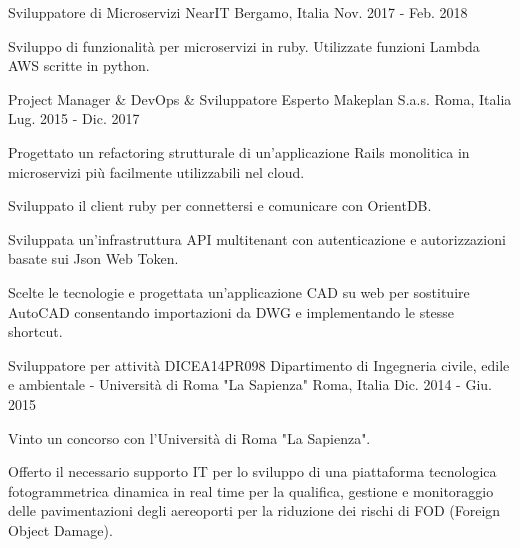 \begin{cventries}
  \cventry
    {Sviluppatore di Microservizi} %
    {NearIT} %
    {Bergamo, Italia} %
    {Nov. 2017 - Feb. 2018} %
    {
      \begin{cvitems} %
        \item {Sviluppo di funzionalità per microservizi in ruby. Utilizzate funzioni Lambda AWS scritte in python.}
      \end{cvitems}
    }

  \cventry
    {Project Manager \& DevOps \& Sviluppatore Esperto} %
    {Makeplan S.a.s.} %
    {Roma, Italia} %
    {Lug. 2015 - Dic. 2017} %
    {
      \begin{cvitems} %
        \item {Progettato un refactoring strutturale di un'applicazione Rails monolitica in microservizi più facilmente utilizzabili nel cloud.}
        \item {Sviluppato il client ruby per connettersi e comunicare con OrientDB.}
        \item {Sviluppata un'infrastruttura API multitenant con autenticazione e autorizzazioni basate sui Json Web Token.}
        \item {Scelte le tecnologie e progettata un'applicazione CAD su web per sostituire AutoCAD consentando importazioni da DWG e implementando le stesse shortcut.}
      \end{cvitems}
    }

  \cventry
    {Sviluppatore per attività DICEA14PR098} %
    {Dipartimento di Ingegneria civile, edile e ambientale - Università di Roma "La Sapienza"} %
    {Roma, Italia} %
    {Dic. 2014 - Giu. 2015} %
    {
      \begin{cvitems} %
        \item {Vinto un concorso con l'Università di Roma "La Sapienza".}
        \item {Offerto il necessario supporto IT per lo sviluppo di una piattaforma tecnologica fotogrammetrica dinamica in real time per la qualifica, gestione e monitoraggio delle pavimentazioni degli aereoporti per la riduzione dei rischi di FOD (Foreign Object Damage).}
      \end{cvitems}
    }


\end{cventries}
